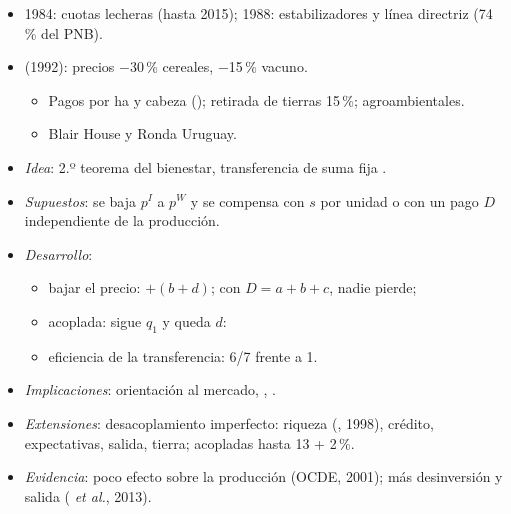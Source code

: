 \documentclass{article}
\begin{document}
\begin{columnas}
\begin{itemize}
\item 1984: cuotas lecheras (hasta 2015); 1988: estabilizadores y línea directriz (74\,\% del PNB).
\item \textbf{} (1992): precios $-$30\,\% cereales, $-$15\,\% vacuno.
  \begin{itemize}
  \item Pagos por ha y cabeza (); retirada de tierras 15\,\%; agroambientales.
  \item Blair House y Ronda Uruguay.
  \end{itemize}
\end{itemize}
\begin{itemize}
\item \emph{Idea}: 2.º teorema del bienestar, transferencia de suma fija .
\item \emph{Supuestos}: se baja $p^I$ a $p^W$ y se compensa con $s$ por unidad o con un pago $D$ independiente de la producción.
\item \emph{Desarrollo}:
  \begin{itemize}
  \item bajar el precio: $+(b+d)$; con $D=a+b+c$, nadie pierde;
  \item acoplada: sigue $q_1$ y queda $d$:
  \item eficiencia de la transferencia: 6/7 frente a 1.
  \end{itemize}
\end{itemize}
\begin{itemize}
\item \emph{Implicaciones}: orientación al mercado, , .
\item \emph{Extensiones}: desacoplamiento imperfecto: riqueza (, 1998), crédito, expectativas, salida, tierra; acopladas hasta 13 + 2\,\%.
\item \emph{Evidencia}: poco efecto sobre la producción (OCDE, 2001); más desinversión y salida ( \emph{et al.}, 2013).

\end{itemize}
\end{columnas}
\end{document}
